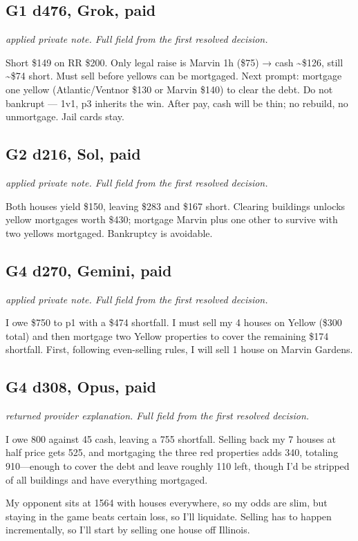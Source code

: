 \subsection*{G1 d476, Grok, paid}
{\small\textit{applied private note. Full field from the first resolved decision.}\par Short \$149 on RR \$200. Only legal raise is Marvin 1h (\$75) → cash \textasciitilde{}\$126, still \textasciitilde{}\$74 short. Must sell before yellows can be mortgaged. Next prompt: mortgage one yellow (Atlantic/Ventnor \$130 or Marvin \$140) to clear the debt. Do not bankrupt — 1v1, p3 inherits the win. After pay, cash will be thin; no rebuild, no unmortgage. Jail cards stay.\par}
\subsection*{G2 d216, Sol, paid}
{\small\textit{applied private note. Full field from the first resolved decision.}\par Both houses yield \$150, leaving \$283 and \$167 short. Clearing buildings unlocks yellow mortgages worth \$430; mortgage Marvin plus one other to survive with two yellows mortgaged. Bankruptcy is avoidable.\par}
\subsection*{G4 d270, Gemini, paid}
{\small\textit{applied private note. Full field from the first resolved decision.}\par I owe \$750 to p1 with a \$474 shortfall. I must sell my 4 houses on Yellow (\$300 total) and then mortgage two Yellow properties to cover the remaining \$174 shortfall. First, following even-selling rules, I will sell 1 house on Marvin Gardens.\par}
\subsection*{G4 d308, Opus, paid}
{\small\textit{returned provider explanation. Full field from the first resolved decision.}\par I owe 800 against 45 cash, leaving a 755 shortfall. Selling back my 7 houses at half price gets 525, and mortgaging the three red properties adds 340, totaling 910—enough to cover the debt and leave roughly 110 left, though I'd be stripped of all buildings and have everything mortgaged.\par My opponent sits at 1564 with houses everywhere, so my odds are slim, but staying in the game beats certain loss, so I'll liquidate. Selling has to happen incrementally, so I'll start by selling one house off Illinois.\par \par}
